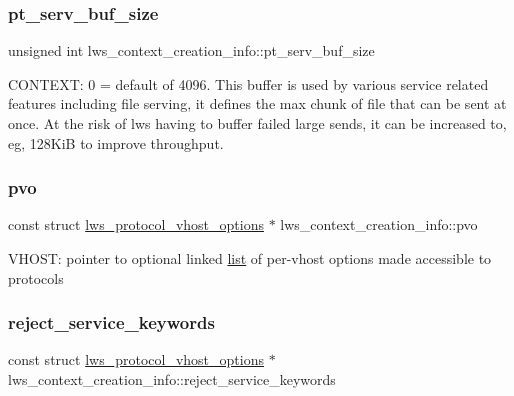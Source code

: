 \subsubsection{\texorpdfstring{pt\+\_\+serv\+\_\+buf\+\_\+size}{pt\_serv\_buf\_size}}
{\footnotesize\ttfamily unsigned int lws\+\_\+context\+\_\+creation\+\_\+info\+::pt\+\_\+serv\+\_\+buf\+\_\+size}

C\+O\+N\+T\+E\+XT\+: 0 = default of 4096. This buffer is used by various service related features including file serving, it defines the max chunk of file that can be sent at once. At the risk of lws having to buffer failed large sends, it can be increased to, eg, 128\+KiB to improve throughput. \mbox{\label{structlws__context__creation__info_a05b00b2b00fa958ad93285cacd668732}} 
\subsubsection{\texorpdfstring{pvo}{pvo}}
{\footnotesize\ttfamily const struct \hyperlink{structlws__protocol__vhost__options}{lws\+\_\+protocol\+\_\+vhost\+\_\+options} $\ast$ lws\+\_\+context\+\_\+creation\+\_\+info\+::pvo}

V\+H\+O\+ST\+: pointer to optional linked \hyperlink{protocollist-p}{list} of per-\/vhost options made accessible to protocols \mbox{\label{structlws__context__creation__info_a64f9df91de3153e7dce270e0ef1abce3}} 
\subsubsection{\texorpdfstring{reject\+\_\+service\+\_\+keywords}{reject\_service\_keywords}}
{\footnotesize\ttfamily const struct \hyperlink{structlws__protocol__vhost__options}{lws\+\_\+protocol\+\_\+vhost\+\_\+options} $\ast$ lws\+\_\+context\+\_\+creation\+\_\+info\+::reject\+\_\+service\+\_\+keywords}

